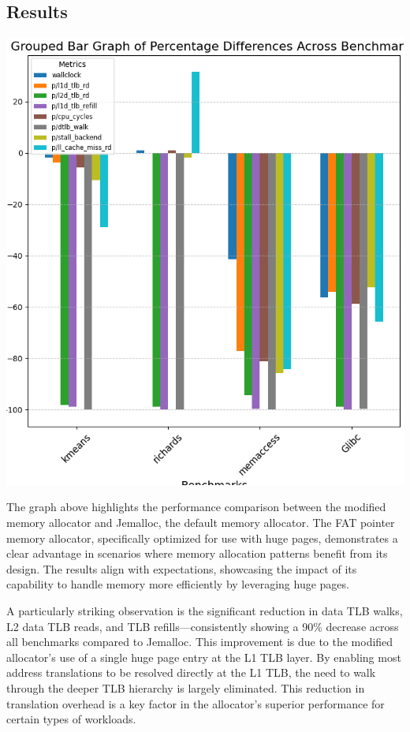 \documentclass[11pt]{article}
\begin{document}
\subsection{Results}
\label{sec:org306bf15}
\begin{center}
\includegraphics[width=.9\linewidth]{./diagrams/allbenchmarks.png}
\end{center}


The graph above highlights the performance comparison between the modified memory allocator and 
Jemalloc, the default memory allocator. The FAT pointer memory allocator, specifically optimized 
for use with huge pages, demonstrates a clear advantage in scenarios where memory allocation 
patterns benefit from its design. The results align with expectations, showcasing the impact 
of its capability to handle memory more efficiently by leveraging huge pages.

A particularly striking observation is the significant reduction in data TLB walks, 
L2 data TLB reads, and TLB refills—consistently showing a 90\% decrease across all 
benchmarks compared to Jemalloc. This improvement is due to the modified allocator's 
use of a single huge page entry at the L1 TLB layer. By enabling most address translations 
to be resolved directly at the L1 TLB, the need to walk through the deeper TLB hierarchy is 
largely eliminated. This reduction in translation overhead is a key factor in the allocator's 
superior performance for certain types of workloads.
\end{document}
